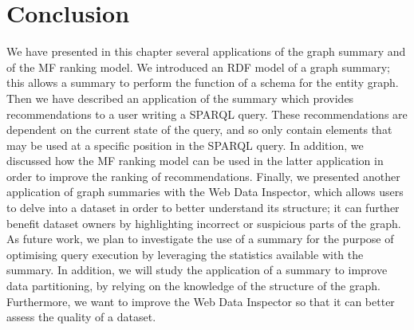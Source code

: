 \section{Conclusion}

We have presented in this chapter several applications of the graph summary and of the \gls{MF} ranking model. We introduced an RDF model of a graph summary; this allows a summary to perform the function of a schema for the entity graph. Then we have described an application of the summary which provides recommendations to a user writing a SPARQL query. These recommendations are dependent on the current state of the query, and so only contain elements that may be used at a specific position in the SPARQL query. In addition, we discussed how the \gls{MF} ranking model can be used in the latter application in order to improve the ranking of recommendations. Finally, we presented another application of graph summaries with the Web Data Inspector, which allows users to delve into a dataset in order to better understand its structure; it can further benefit dataset owners by highlighting incorrect or suspicious parts of the graph.\\

As future work, we plan to investigate the use of a summary for the purpose of optimising query execution by leveraging the statistics available with the summary. In addition, we will study the application of a summary to improve data partitioning, by relying on the knowledge of the structure of the graph. Furthermore, we want to improve the Web Data Inspector so that it can better assess the quality of a dataset.

